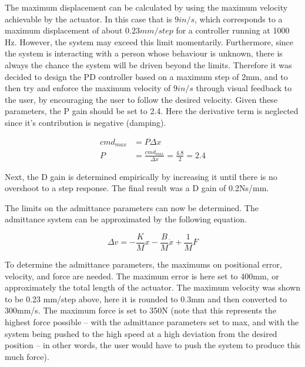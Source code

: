 \documentclass[12pt]{report}
\begin{document}
	The maximum displacement can be calculated by using the maximum velocity achievable by the actuator. In this case that is $9 in/s$, which corresponds to a maximum displacement of about $0.23 mm/step$ for a controller running at 1000 Hz. However, the system may exceed this limit momentarily. Furthermore, since the system is interacting with a person whose behaviour is unknown, there is always the chance the system will be driven beyond the limits. Therefore it was decided to design the PD controller based on a maximum step of 2mm, and to then try and enforce the maximum velocity of $9 in/s$ through visual feedback to the user, by encouraging the user to follow the desired velocity. Given these parameters, the P gain should be set to 2.4. Here the derivative term is neglected since it's contribution is negative (damping). 
	
	\begin{align*}
		cmd_{max} &= P\Delta x \\
		P &= \frac{cmd_{max}}{\Delta x} = \frac{4.8}{2} =  2.4
	\end{align*}
	
	Next, the D gain is determined empirically by increasing it until there is no overshoot to a step response. The final result was a D gain of 0.2Ns/mm. 
	
	The limits on the admittance parameters can now be determined. The admittance system can be approximated by the following equation. 
	
	\begin{equation} \label{eqn:adm_param}
		\Delta v = - \frac{K}{M}x - \frac{B}{M}\dot{x} + \frac{1}{M}F
	\end{equation}
	
	
	To determine the admittance parameters, the maximums on positional error, velocity, and force are needed. The maximum error is here set to 400mm, or approximately the total length of the actuator. The maximum velocity was shown to be 0.23 mm/step above, here it is rounded to 0.3mm and then converted to 300mm/s. The maximum force is set to 350N (note that this represents the highest force possible -- with the admittance parameters set to max, and with the system being pushed to the high speed at a high deviation from the desired position -- in other words, the user would have to push the system to produce this much force). 
	
\end{document}
